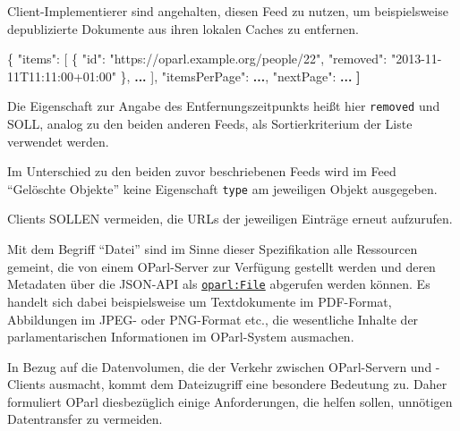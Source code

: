 \documentclass[,a4paper]{article}
\newenvironment{Shaded}{}{}
\newcommand{\DataTypeTok}[1]{\textcolor[rgb]{0.56,0.13,0.00}{{#1}}}
\newcommand{\StringTok}[1]{\textcolor[rgb]{0.25,0.44,0.63}{{#1}}}
\newcommand{\OtherTok}[1]{\textcolor[rgb]{0.00,0.44,0.13}{{#1}}}
\newcommand{\FunctionTok}[1]{\textcolor[rgb]{0.02,0.16,0.49}{{#1}}}
\newcommand{\ErrorTok}[1]{\textcolor[rgb]{1.00,0.00,0.00}{\textbf{{#1}}}}
\begin{document}
Client-Implementierer sind angehalten, diesen Feed zu nutzen, um
beispielsweise depublizierte Dokumente aus ihren lokalen Caches zu
entfernen.

\begin{Shaded}
\begin{Highlighting}[]
\FunctionTok{\{}
    \DataTypeTok{"items"}\FunctionTok{:} \OtherTok{[}
        \FunctionTok{\{}
            \DataTypeTok{"id"}\FunctionTok{:} \StringTok{"https://oparl.example.org/people/22"}\FunctionTok{,}
            \DataTypeTok{"removed"}\FunctionTok{:} \StringTok{"2013-11-11T11:11:00+01:00"}
        \FunctionTok{\}}\OtherTok{,}
        \ErrorTok{...}
    \OtherTok{]}\FunctionTok{,}
    \DataTypeTok{"itemsPerPage"}\FunctionTok{:} \ErrorTok{...}\FunctionTok{,}
    \DataTypeTok{"nextPage"}\FunctionTok{:} \ErrorTok{...}
\ErrorTok{]}
\end{Highlighting}
\end{Shaded}

Die Eigenschaft zur Angabe des Entfernungszeitpunkts heißt hier
\texttt{removed} und SOLL, analog zu den beiden anderen Feeds, als
Sortierkriterium der Liste verwendet werden.

Im Unterschied zu den beiden zuvor beschriebenen Feeds wird im Feed
``Gelöschte Objekte'' keine Eigenschaft \texttt{type} am jeweiligen
Objekt ausgegeben.

Clients SOLLEN vermeiden, die URLs der jeweiligen Einträge erneut
aufzurufen.


Mit dem Begriff ``Datei'' sind im Sinne dieser Spezifikation alle
Ressourcen gemeint, die von einem OParl-Server zur Verfügung gestellt
werden und deren Metadaten über die JSON-API als
\hyperref[oparlux5fdocument]{\texttt{oparl:File}} abgerufen werden
können. Es handelt sich dabei beispielsweise um Textdokumente im
PDF-Format, Abbildungen im JPEG- oder PNG-Format etc., die wesentliche
Inhalte der parlamentarischen Informationen im OParl-System ausmachen.

In Bezug auf die Datenvolumen, die der Verkehr zwischen OParl-Servern
und -Clients ausmacht, kommt dem Dateizugriff eine besondere Bedeutung
zu. Daher formuliert OParl diesbezüglich einige Anforderungen, die
helfen sollen, unnötigen Datentransfer zu vermeiden.
\end{document}

